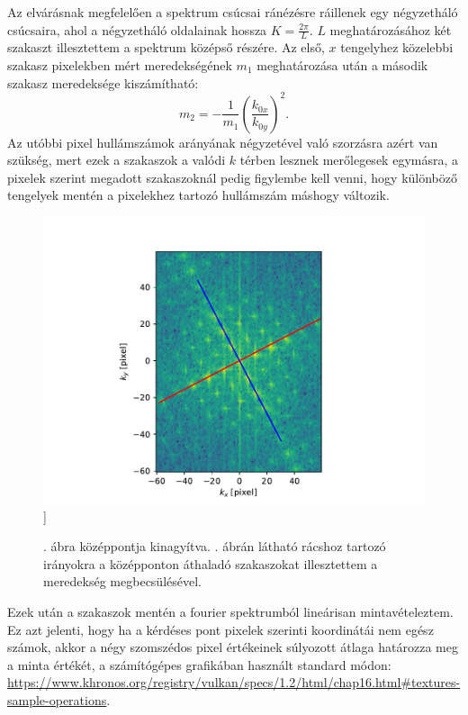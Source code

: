 \documentclass[pdftex,12pt,a4paper]{article}
\begin{document}
		Az elvárásnak megfelelően a spektrum csúcsai ránézésre ráillenek egy négyzetháló csúcsaira, ahol a négyzetháló oldalainak hossza $K=\frac{2\pi}{L}$. $L$ meghatározásához két szakaszt illesztettem a spektrum középső részére. Az első, $x$ tengelyhez közelebbi szakasz pixelekben mért meredekségének $m_1$ meghatározása után a második szakasz meredeksége kiszámítható:
		\begin{equation}
			m_2 = -\frac{1}{m_1}\left(\frac{k_{0x}}{k_{0y}}\right)^2.
		\end{equation}
		Az utóbbi pixel hullámszámok arányának négyzetével való szorzásra azért van szükség, mert ezek a szakaszok a valódi $k$ térben lesznek merőlegesek egymásra, a pixelek szerint megadott szakaszoknál pedig figylembe kell venni, hogy különböző tengelyek mentén a pixelekhez tartozó hullámszám máshogy változik.
		\begin{figure}[H]
			\centering
			\includegraphics[scale=1]{./figs/fftlines.pdf}]
			\caption{. ábra középpontja kinagyítva. . ábrán látható rácshoz tartozó irányokra a középponton áthaladó szakaszokat illesztettem a meredekség megbecsülésével.}
			\label{fftlines}
		\end{figure}
		Ezek után a szakaszok mentén a fourier spektrumból lineárisan mintavételeztem. Ez azt jelenti, hogy ha a kérdéses pont pixelek szerinti koordinátái nem egész számok, akkor a négy szomszédos pixel értékeinek súlyozott átlaga határozza meg a minta értékét, a számítógépes grafikában használt standard módon: \url{https://www.khronos.org/registry/vulkan/specs/1.2/html/chap16.html#textures-sample-operations}.
\end{document}

